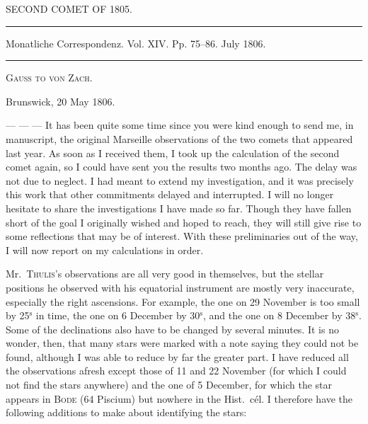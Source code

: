 \clearpage
{}
\hypertarget{native-275-lower}{}
\begin{center}
SECOND COMET OF 1805.

\rule{0.6\linewidth}{0.4pt}

Monatliche Correspondenz. Vol. XIV. Pp. 75–86. July 1806.

\rule{0.6\linewidth}{0.4pt}

\textsc{Gauss to von Zach.}
\end{center}
\begin{flushright}
Brunswick, 20 May 1806.
\end{flushright}

\par\indent --- --- --- It has been quite some time since you were kind enough to send me, in manuscript, the original Marseille observations of the two comets that appeared last year. As soon as I received them, I took up the calculation of the second comet again, so I could have sent you the results two months ago. The delay was not due to neglect. I had meant to extend my investigation, and it was precisely this work that other commitments delayed and interrupted. I will no longer hesitate to share the investigations I have made so far. Though they have fallen short of the goal I originally wished and hoped to reach, they will still give rise to some reflections that may be of interest. With these preliminaries out of the way, I will now report on my calculations in order.

\par\indent Mr.~\textsc{Thulis}’s observations are all very good in themselves, but the stellar positions he observed with his equatorial instrument are mostly very inaccurate, especially the right ascensions. For example, the one on 29 November is too small by 25$^{\mathrm{s}}$ in time, the one on 6 December by 30$^{\mathrm{s}}$, and the one on 8 December by 38$^{\mathrm{s}}$. Some of the declinations also have to be changed by several minutes. It is no wonder, then, that many stars were marked with a note saying they could not be found, although I was able to reduce by far the greater part. I have reduced all the observations afresh except those of 11 and 22 November (for which I
%
could not find the stars anywhere) and the one of 5 December, for which the star appears in \textsc{Bode} (64 Piscium) but nowhere in the Hist.\ cél. I therefore have the following additions to make about identifying the stars:

